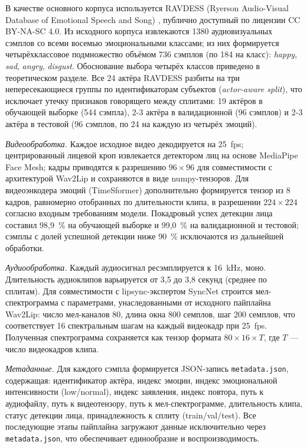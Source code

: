 \documentclass[a4paper, 12pt, oneside, openany]{article}
\begin{document}
В качестве основного корпуса используется RAVDESS (Ryerson Audio-Visual Database of Emotional Speech and Song) \cite{livingstone2018ravdess}, публично доступный по лицензии CC BY-NA-SC 4.0. Из исходного корпуса извлекаются 1380 аудиовизуальных сэмплов со всеми восемью эмоциональными классами; из них формируется четырёхклассовое подмножество объёмом 736 сэмплов (по 184 на класс): \textit{happy}, \textit{sad}, \textit{angry}, \textit{disgust}. Обоснование выбора четырёх классов приведено в теоретическом разделе. Все 24 актёра RAVDESS разбиты на три непересекающиеся группы по идентификаторам субъектов (\textit{actor-aware split}), что исключает утечку признаков говорящего между сплитами: 19 актёров в обучающей выборке (544 сэмпла), 2-3 актёра в валидационной (96 сэмплов) и 2-3 актёра в тестовой (96 сэмплов, по 24 на каждую из четырёх эмоций).

\textit{Видеообработка.} Каждое исходное видео декодируется на 25~fps; центрированный лицевой кроп извлекается детектором лиц на основе MediaPipe Face Mesh; кадры приводятся к разрешению $96 \times 96$ для совместимости с архитектурой Wav2Lip и сохраняются в виде numpy-тензоров. Для видеоэнкодера эмоций (TimeSformer) дополнительно формируется тензор из 8 кадров, равномерно отобранных по длительности клипа, в разрешении $224 \times 224$ согласно входным требованиям модели. Покадровый успех детекции лица составил 98,9~\% на обучающей выборке и 99,0~\% на валидационной и тестовой; сэмплы с долей успешной детекции ниже 90~\% исключаются из дальнейшей обработки.

\textit{Аудиообработка.} Каждый аудиосигнал ресэмплируется к 16~kHz, моно. Длительность аудиоклипов варьируется от 3,5 до 3,8 секунд (среднее по сплитам). Для совместимости с lipsync-экспертом SyncNet строится мел-спектрограмма с параметрами, унаследованными от исходного пайплайна Wav2Lip: число мел-каналов 80, длина окна 800 семплов, шаг 200 семплов, что соответствует 16 спектральным шагам на каждый видеокадр при 25~fps. Полученная спектрограмма сохраняется как тензор формата $80 \times 16 \times T$, где $T$ --- число видеокадров клипа.

\textit{Метаданные.} Для каждого сэмпла формируется JSON-запись \texttt{metadata.json}, содержащая: идентификатор актёра, индекс эмоции, индекс эмоциональной интенсивности (low/normal), индекс заявления, индекс повтора, путь к аудиофайлу, путь к видеотензору, путь к мел-спектрограмме, длительность клипа, статус детекции лица, принадлежность к сплиту (train/val/test). Все последующие этапы пайплайна загружают данные исключительно через \texttt{metadata.json}, что обеспечивает единообразие и воспроизводимость.
\end{document}
